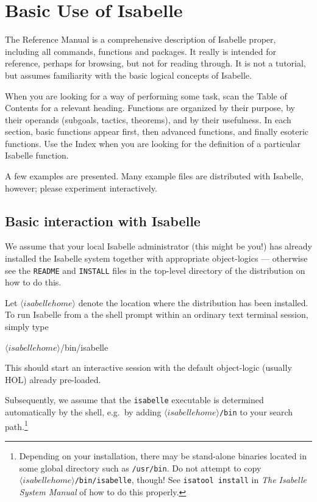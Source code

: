 

\chapter{Basic Use of Isabelle} 
The Reference Manual is a comprehensive description of Isabelle
proper, including all \ML{} commands, functions and packages.  It
really is intended for reference, perhaps for browsing, but not for
reading through.  It is not a tutorial, but assumes familiarity with
the basic logical concepts of Isabelle.

When you are looking for a way of performing some task, scan the Table of
Contents for a relevant heading.  Functions are organized by their purpose,
by their operands (subgoals, tactics, theorems), and by their usefulness.
In each section, basic functions appear first, then advanced functions, and
finally esoteric functions.  Use the Index when you are looking for the
definition of a particular Isabelle function.

A few examples are presented.  Many example files are distributed with
Isabelle, however; please experiment interactively.


\section{Basic interaction with Isabelle}
\nobreak
%
We assume that your local Isabelle administrator (this might be you!) has
already installed the Isabelle system together with appropriate object-logics
--- otherwise see the \texttt{README} and \texttt{INSTALL} files in the
top-level directory of the distribution on how to do this.

\medskip Let $\langle isabellehome \rangle$ denote the location where
the distribution has been installed.  To run Isabelle from a the shell
prompt within an ordinary text terminal session, simply type
\begin{ttbox}
\({\langle}isabellehome{\rangle}\)/bin/isabelle
\end{ttbox}
This should start an interactive \ML{} session with the default object-logic
(usually HOL) already pre-loaded.

Subsequently, we assume that the \texttt{isabelle} executable is determined
automatically by the shell, e.g.\ by adding {\tt \(\langle isabellehome
  \rangle\)/bin} to your search path.\footnote{Depending on your installation,
  there may be stand-alone binaries located in some global directory such as
  \texttt{/usr/bin}.  Do not attempt to copy {\tt \(\langle isabellehome
    \rangle\)/bin/isabelle}, though!  See \texttt{isatool install} in
  \emph{The Isabelle System Manual} of how to do this properly.}

